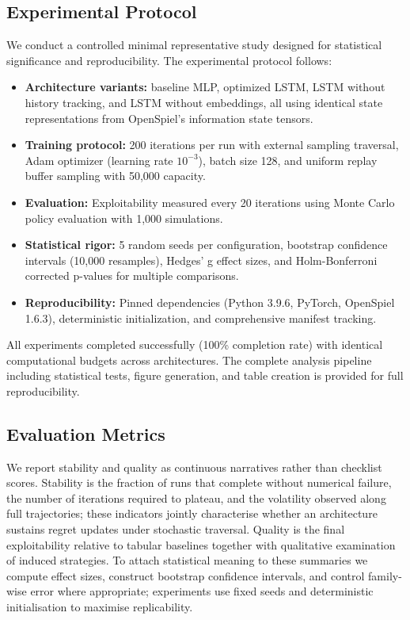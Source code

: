 \documentclass[10pt,twocolumn]{article}
\theoremstyle{definition}
\begin{document}
\subsection{Experimental Protocol}

We conduct a controlled minimal representative study designed for statistical significance and reproducibility. The experimental protocol follows:

\begin{itemize}
    \item \textbf{Architecture variants:} baseline MLP, optimized LSTM, LSTM without history tracking, and LSTM without embeddings, all using identical state representations from OpenSpiel's information state tensors.
    \item \textbf{Training protocol:} 200 iterations per run with external sampling traversal, Adam optimizer (learning rate $10^{-3}$), batch size 128, and uniform replay buffer sampling with 50,000 capacity.
    \item \textbf{Evaluation:} Exploitability measured every 20 iterations using Monte Carlo policy evaluation with 1,000 simulations.
    \item \textbf{Statistical rigor:} 5 random seeds per configuration, bootstrap confidence intervals (10,000 resamples), Hedges' g effect sizes, and Holm-Bonferroni corrected p-values for multiple comparisons.
    \item \textbf{Reproducibility:} Pinned dependencies (Python 3.9.6, PyTorch, OpenSpiel 1.6.3), deterministic initialization, and comprehensive manifest tracking.
\end{itemize}

All experiments completed successfully (100\% completion rate) with identical computational budgets across architectures. The complete analysis pipeline including statistical tests, figure generation, and table creation is provided for full reproducibility.

\subsection{Evaluation Metrics}

We report stability and quality as continuous narratives rather than checklist scores. Stability is the fraction of runs that complete without numerical failure, the number of iterations required to plateau, and the volatility observed along full trajectories; these indicators jointly characterise whether an architecture sustains regret updates under stochastic traversal. Quality is the final exploitability relative to tabular baselines together with qualitative examination of induced strategies. To attach statistical meaning to these summaries we compute effect sizes, construct bootstrap confidence intervals, and control family-wise error where appropriate; experiments use fixed seeds and deterministic initialisation to maximise replicability.
\end{document}
